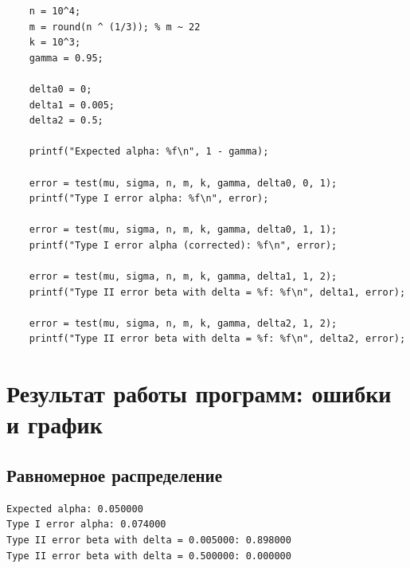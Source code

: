 \documentclass{article}
\begin{document}
\begin{lstlisting}[caption={sol\_for\_norm.m}]
    % Calc Errors
    n = 10^4;
    m = round(n ^ (1/3)); % m ~ 22
    k = 10^3;
    gamma = 0.95;
    
    delta0 = 0;
    delta1 = 0.005;
    delta2 = 0.5;
    
    printf("Expected alpha: %f\n", 1 - gamma);
    
    error = test(mu, sigma, n, m, k, gamma, delta0, 0, 1);
    printf("Type I error alpha: %f\n", error);
    
    error = test(mu, sigma, n, m, k, gamma, delta0, 1, 1);
    printf("Type I error alpha (corrected): %f\n", error);
    
    error = test(mu, sigma, n, m, k, gamma, delta1, 1, 2);
    printf("Type II error beta with delta = %f: %f\n", delta1, error);
    
    error = test(mu, sigma, n, m, k, gamma, delta2, 1, 2);
    printf("Type II error beta with delta = %f: %f\n", delta2, error);
\end{lstlisting}        
    \section{Результат работы программ: ошибки и график}
        \subsection{Равномерное распределение}
\begin{verbatim}
Expected alpha: 0.050000
Type I error alpha: 0.074000
Type II error beta with delta = 0.005000: 0.898000
Type II error beta with delta = 0.500000: 0.000000
\end{verbatim}
            \newpage
            \begin{figure}[h]
        	\end{figure}    
\end{document}
